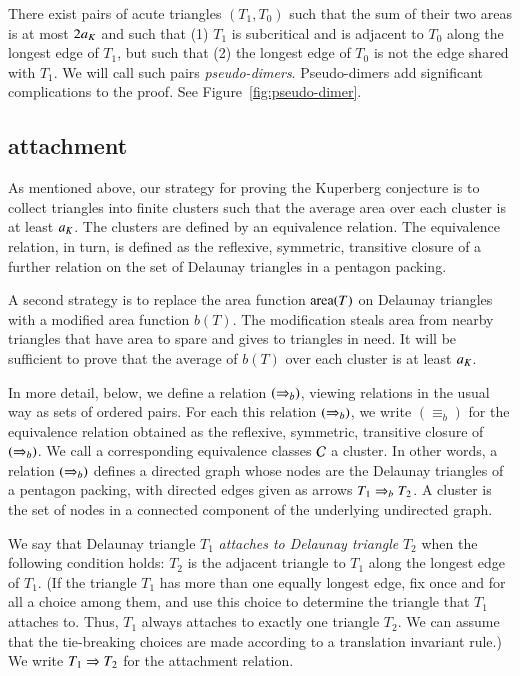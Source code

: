 
\begin{example} There exist pairs of acute triangles $(T_1,T_0)$ such that the sum of their two areas
 is at most $2a_K$ and such that (1) $T_1$ is subcritical and is adjacent to $T_0$ 
along the longest edge of $T_1$, but such that (2) the longest edge of $T_0$ is 
not the edge shared with $T_1$.  We will call such pairs {\it pseudo-dimers}.
 Pseudo-dimers add significant complications to the proof.
See Figure~\ref{fig:pseudo-dimer}.
\end{example}


\subsection{attachment}

As mentioned above, our strategy for proving the Kuperberg conjecture
is to collect triangles into finite clusters such that the average
area over each cluster is at least $a_K$.  The clusters are defined by
an  equivalence relation.  The equivalence relation, in turn,
is defined as the reflexive, symmetric, transitive closure of a further
relation on the set of Delaunay triangles in a pentagon packing.

A second strategy is to replace the area function ${\operatorname{area}}(T)$ on Delaunay
triangles with a modified area function $b(T)$.  The modification steals area from
nearby triangles that have area to spare and gives to triangles in need.  It will 
be sufficient to prove that the average of $b(T)$ over each cluster is at least $a_K$.


In more detail, below, we define a  relation $(\Rightarrow_{b})$, viewing
relations in the usual way as sets of ordered pairs.  For each
this relation $(\Rightarrow_{b})$, we write ${(\equiv_{b})}$ for the equivalence
relation obtained as the reflexive, symmetric, transitive closure of
$(\Rightarrow_{b})$.  We call a corresponding equivalence classes $\mathcal C$ a
cluster.  In other words, a relation $(\Rightarrow_{b})$ defines a directed
graph whose nodes are the Delaunay triangles of a pentagon packing,
with directed edges given as arrows $T_1\Rightarrow_{b} T_2$.  A cluster
is the set of nodes in a connected component of the underlying
undirected graph.

We say that Delaunay triangle $T_1$ {\it attaches to Delaunay
  triangle} $T_2$ when  the following condition holds: $T_2$
is the adjacent triangle to $T_1$ along the longest edge of $T_1$.
(If the triangle $T_1$ has more than one equally longest edge, fix
once and for all a choice among them, and use this choice to determine
the triangle that $T_1$ attaches to.  Thus, $T_1$ always attaches to
exactly one triangle $T_2$.  We can assume that the tie-breaking
choices are made according to a translation invariant rule.)  We write
$T_1 \Rightarrow T_2$ for the attachment relation.



